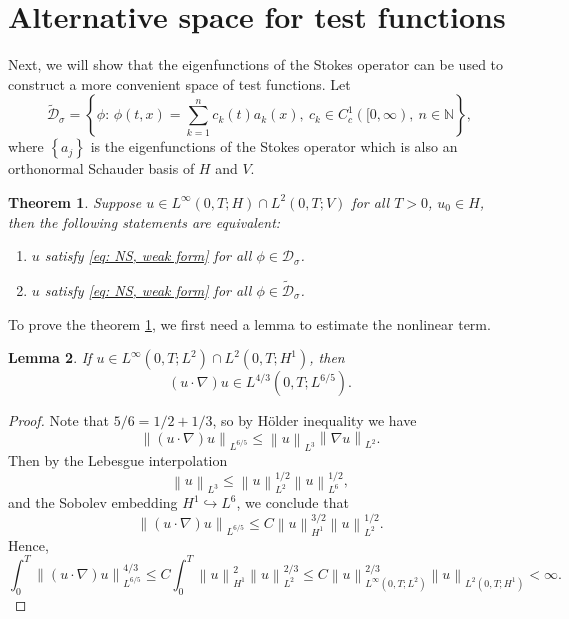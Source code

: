 \documentclass[a4paper, 12pt, oneside]{amsart}
\newtheorem{theorem}{Theorem}
\newtheorem{lemma}[theorem]{Lemma}
\theoremstyle{definition}
\theoremstyle{remark}
\newcommand{\norm}[1]{\left\lVert #1 \right\rVert}
\newcommand{\set}[1]{\left\{ #1 \right\}}
\renewcommand{\mid}{:\,}
\renewcommand{\leq}{\leqslant}
\newcommand{\mc}[1]{\mathcal{#1}}
\newcommand{\N}{\mathbb{N}}
\begin{document}
\section{Alternative space for test functions}

Next, we will show that the eigenfunctions of the Stokes operator can be used to construct a more convenient space of test functions. Let
\[
    \tilde{\mc{D}}_\sigma = \set{\phi\mid \phi(t, x) = \sum_{k=1}^nc_k(t)a_k(x),\ c_k\in C_c^1([0, \infty),\ n\in\N},
\]
where $\set{a_j}$ is the eigenfunctions of the Stokes operator which is also an orthonormal Schauder basis of $H$ and $V$.

\begin{theorem}
    \label{thm: equiv def of weak sol}
    Suppose $u\in L^\infty(0, T; H)\cap L^2(0, T; V)$ for all $T>0$, $u_0\in H$, then the following statements are equivalent:
    \begin{enumerate}
        \item $u$ satisfy \eqref{eq: NS, weak form} for all $\phi\in\mc{D}_\sigma$.
        \item $u$ satisfy \eqref{eq: NS, weak form} for all $\phi\in\tilde{\mc{D}}_\sigma$.
    \end{enumerate}
\end{theorem}

To prove the theorem \ref{thm: equiv def of weak sol}, we first need a lemma to estimate the nonlinear term.

\begin{lemma}
    \label{lemma: nonlinear term estimate}
    If $u\in L^\infty(0, T; L^2)\cap L^2(0, T; H^1)$, then
    \[
        (u\cdot\nabla)u\in L^{4/3}(0, T; L^{6/5}).
    \]
\end{lemma}

\begin{proof}
    Note that $5/6=1/2+1/3$, so by H\"older inequality we have
    \[
        \norm{(u\cdot\nabla)u}_{L^{6/5}}\leq\norm{u}_{L^3}\norm{\nabla u}_{L^2}.
    \]
    Then by the Lebesgue interpolation
    \[
        \norm{u}_{L^3}\leq\norm{u}_{L^2}^{1/2}\norm{u}_{L^6}^{1/2},
    \]
    and the Sobolev embedding $H^1\hookrightarrow L^6$, we conclude that
    \[
        \norm{(u\cdot\nabla)u}_{L^{6/5}}\leq C\norm{u}_{H^1}^{3/2}\norm{u}_{L^2}^{1/2}.
    \]
    Hence,
    \[
        \int_0^T\norm{(u\cdot\nabla)u}_{L^{6/5}}^{4/3}\leq C\int_0^T\norm{u}_{H^1}^2\norm{u}_{L^2}^{2/3}\leq C\norm{u}_{L^\infty(0, T; L^2)}^{2/3}\norm{u}_{L^2(0, T; H^1)} <\infty.
    \]
\end{proof}
\end{document}
